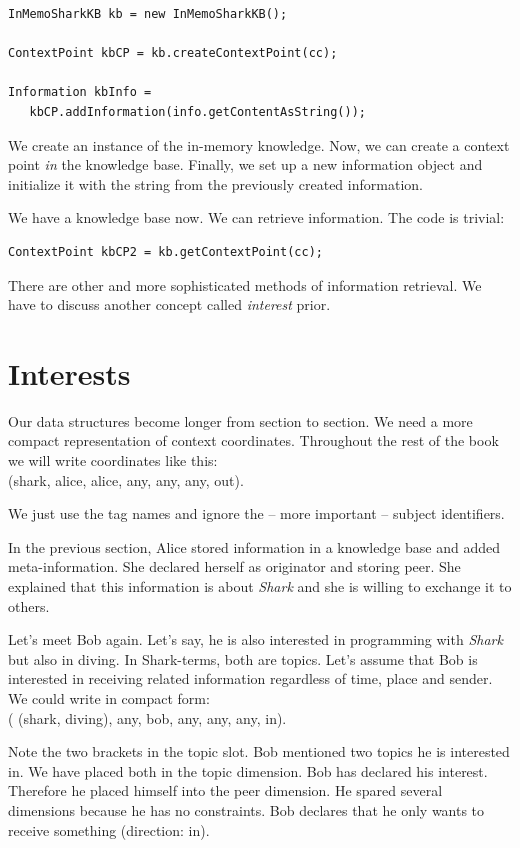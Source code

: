 \begin{verbatim}
InMemoSharkKB kb = new InMemoSharkKB();

ContextPoint kbCP = kb.createContextPoint(cc);

Information kbInfo = 
   kbCP.addInformation(info.getContentAsString());
\end{verbatim}

We create an instance of the in-memory knowledge. Now, we can create a context point {\it in} the knowledge base. Finally, we set up a new information object and initialize it with the string from the previously created information.

We have a knowledge base now. We can retrieve information. The code is trivial:

\begin{verbatim}
ContextPoint kbCP2 = kb.getContextPoint(cc);
\end{verbatim}

There are other and more sophisticated methods of information retrieval. We have to discuss another concept called {\it interest} prior.

\section{Interests}
Our data structures become longer from section to section. We need a more compact representation of context coordinates. Throughout the rest of the book we will write coordinates like this:\\
(shark, alice, alice, any, any, any, out). 

We just use the tag names and ignore the -- more important -- subject identifiers.

In the previous section, Alice stored information in a knowledge base and added meta-information. She declared herself as originator and storing peer. She explained that this information is about {\it Shark} and she is willing to exchange it to others.

Let's meet Bob again. Let's say, he is also interested in programming with {\it Shark} but also in diving. In Shark-terms, both are topics. Let's assume that Bob is interested in receiving related information regardless of time, place and sender. We could write in compact form:\\
( (shark, diving), any, bob, any, any, any, in). 

Note the two brackets in the topic slot. Bob mentioned two topics he is interested in. We have placed both in the topic dimension. Bob has declared his interest. Therefore he placed himself into the peer dimension. He spared several dimensions because he has no constraints. Bob declares that he only wants to receive something (direction: in).

